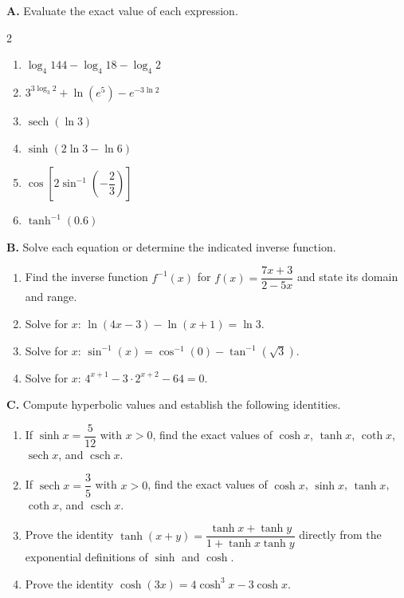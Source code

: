 \raggedcolumns
\setlength{\columnsep}{1.5em}

\medskip
\noindent\textbf{A.} Evaluate the exact value of each expression.

\begin{multicols}{2}
\begin{enumerate}[label=\arabic*., nosep, topsep=0pt, itemsep=2pt]
    \item \(\log_4 144 - \log_4 18 - \log_4 2\)
    \item \(3^{3\log_3 2} + \ln(e^5) - e^{-3\ln 2}\)
    \item \(\operatorname{sech}(\ln 3)\)
    \item \(\sinh(2\ln 3 - \ln 6)\)
    \item \(\cos\!\left[2\sin^{-1}\!\left(-\dfrac{2}{3}\right)\right]\)
    \item \(\tanh^{-1}(0.6)\)
\end{enumerate}
\end{multicols}

\medskip
\noindent\textbf{B.} Solve each equation or determine the indicated inverse function.

\begin{enumerate}[label=\arabic*., start=7, nosep, topsep=0pt, itemsep=2pt]
    \item Find the inverse function \(f^{-1}(x)\) for \(f(x) = \dfrac{7x + 3}{2 - 5x}\) and state its domain and range.
    \item Solve for \(x\): \(\ln(4x - 3) - \ln(x + 1) = \ln 3\).
    \item Solve for \(x\): \(\sin^{-1}(x) = \cos^{-1}(0) - \tan^{-1}(\sqrt{3})\).
    \item Solve for \(x\): \(4^{x+1} - 3 \cdot 2^{x+2} - 64 = 0\).
\end{enumerate}

\medskip
\noindent\textbf{C.} Compute hyperbolic values and establish the following identities.

\begin{enumerate}[label=\arabic*., start=11, nosep, topsep=0pt, itemsep=2pt]
    \item If \(\sinh x = \dfrac{5}{12}\) with \(x > 0\), find the exact values of \(\cosh x\), \(\tanh x\), \(\coth x\), \(\operatorname{sech} x\), and \(\operatorname{csch} x\).
    \item If \(\operatorname{sech} x = \dfrac{3}{5}\) with \(x > 0\), find the exact values of \(\cosh x\), \(\sinh x\), \(\tanh x\), \(\coth x\), and \(\operatorname{csch} x\).
    \item Prove the identity \(\tanh(x + y) = \dfrac{\tanh x + \tanh y}{1 + \tanh x \tanh y}\) directly from the exponential definitions of \(\sinh\) and \(\cosh\).
    \item Prove the identity \(\cosh(3x) = 4\cosh^3 x - 3\cosh x\).
\end{enumerate}

